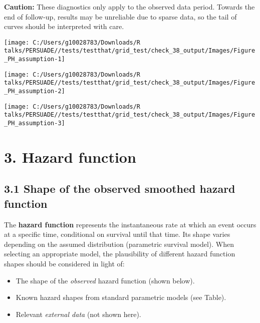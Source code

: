 \documentclass[
]{article}
\providecommand{\tightlist}{%
  \setlength{\itemsep}{0pt}\setlength{\parskip}{0pt}}
\begin{document}
\textbf{Caution:} These diagnostics only apply to the observed data
period. Towards the end of follow-up, results may be unreliable due to
sparse data, so the tail of curves should be interpreted with care.

\clearpage

\begin{flushleft}\texttt{[image: C:/Users/g10028783/Downloads/R talks/PERSUADE//tests/testthat/grid\_test/check\_38\_output/Images/Figure\_PH\_assumption-1]} \end{flushleft}

\begin{flushleft}\texttt{[image: C:/Users/g10028783/Downloads/R talks/PERSUADE//tests/testthat/grid\_test/check\_38\_output/Images/Figure\_PH\_assumption-2]} \end{flushleft}

\begin{flushleft}\texttt{[image: C:/Users/g10028783/Downloads/R talks/PERSUADE//tests/testthat/grid\_test/check\_38\_output/Images/Figure\_PH\_assumption-3]} \end{flushleft}

\clearpage

\section{3. Hazard function}\label{hazard-function}

\subsection{3.1 Shape of the observed smoothed hazard
function}\label{shape-of-the-observed-smoothed-hazard-function}

The \textbf{hazard function} represents the instantaneous rate at which
an event occurs at a specific time, conditional on survival until that
time. Its shape varies depending on the assumed distribution (parametric
survival model). When selecting an appropriate model, the plausibility
of different hazard function shapes should be considered in light of:

\begin{itemize}
\tightlist
\item
  The shape of the \emph{observed} hazard function (shown below).
\item
  Known hazard shapes from standard parametric models (see Table).
\item
  Relevant \emph{external data} (not shown here).
\end{itemize}
\end{document}
